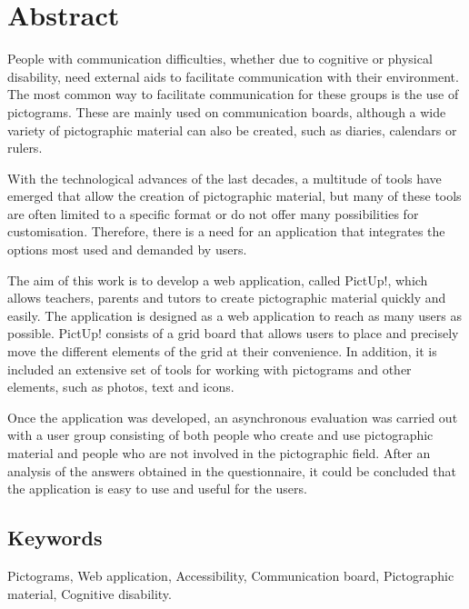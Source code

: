 \chapter*{Abstract}

People with communication difficulties, whether due to cognitive or physical disability, need external aids to facilitate communication with their environment. The most common way to facilitate communication for these groups is the use of pictograms. These are mainly used on communication boards, although a wide variety of pictographic material can also be created, such as diaries, calendars or rulers.

With the technological advances of the last decades, a multitude of tools have emerged that allow the creation of pictographic material, but many of these tools are often limited to a specific format or do not offer many possibilities for customisation.  Therefore, there is a need for an application that integrates the options most used and demanded by users. 

The aim of this work is to develop a web application, called PictUp!, which allows teachers, parents and tutors to create pictographic material quickly and easily. The application is designed as a web application to reach as many users as possible. PictUp! consists of a grid board that allows users to place and precisely move the different elements of the grid at their convenience. In addition, it is included an extensive set of tools for working with pictograms and other elements, such as photos, text and icons.

Once the application was developed, an asynchronous evaluation was carried out with a user group consisting of both people who create and use pictographic material and people who are not involved in the pictographic field. After an analysis of the answers obtained in the questionnaire, it could be concluded that the application is easy to use and useful for the users.

\section*{Keywords}

\noindent Pictograms, Web application, Accessibility, Communication board, Pictographic material, Cognitive disability.



